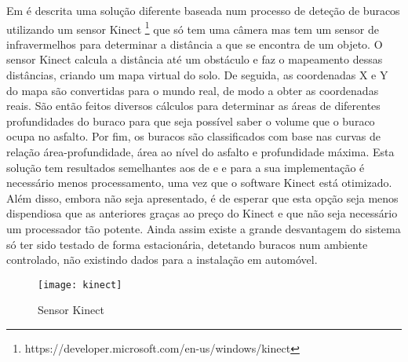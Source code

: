 Em \cite{Moazzam2013} é descrita uma solução diferente baseada num processo de deteção de buracos utilizando um sensor Kinect \footnote{https://developer.microsoft.com/en-us/windows/kinect} que só tem uma câmera mas tem um sensor de infravermelhos para determinar a distância a que se encontra de um objeto.
O sensor Kinect calcula a distância até um obstáculo e faz o mapeamento dessas distâncias, criando um mapa virtual do solo.
De seguida, as coordenadas X e Y do mapa são convertidas para o mundo real, de modo a obter as coordenadas reais.
São então feitos diversos cálculos para determinar as áreas de diferentes profundidades do buraco para que seja possível saber o volume que o buraco ocupa no asfalto.
Por fim, os buracos são classificados com base nas curvas de relação área-profundidade, área ao nível do asfalto e profundidade máxima.
Esta solução tem resultados semelhantes aos de \cite{Zhang} e \cite{Chan2014} e para a sua implementação é necessário menos processamento, uma vez que o software Kinect está otimizado.
Além disso, embora não seja apresentado, é de esperar que esta opção seja menos dispendiosa que as anteriores graças ao preço do Kinect e que não seja necessário um processador tão potente.
Ainda assim existe a grande desvantagem do sistema só ter sido testado de forma estacionária, detetando buracos num ambiente controlado, não existindo dados para a instalação em automóvel.

\begin{figure}[htbp]
	\centering
	\texttt{[image: kinect]}
	\caption[Sensor Kinect]{Sensor Kinect \footnotemark}
	\label{fig:sensor_kinect}
\end{figure}


